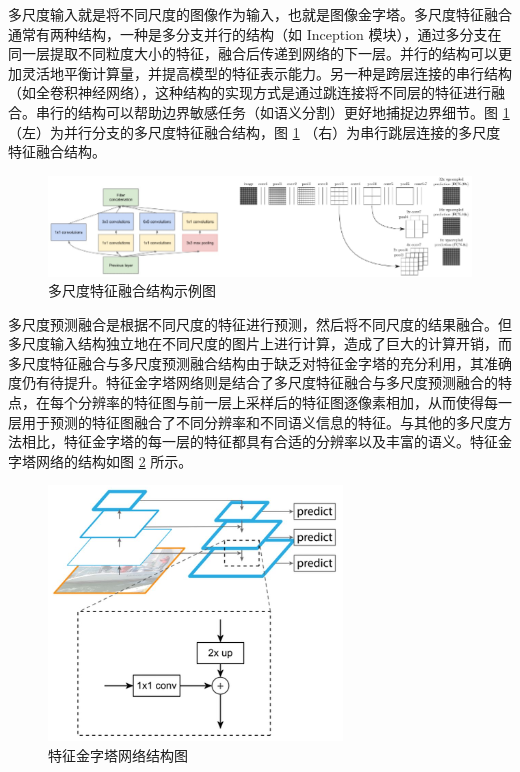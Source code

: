 多尺度输入就是将不同尺度的图像作为输入，也就是图像金字塔。多尺度特征融合通常有两种结构，一种是多分支并行的结构（如 Inception 模块），通过多分支在同一层提取不同粒度大小的特征，融合后传递到网络的下一层。并行的结构可以更加灵活地平衡计算量，并提高模型的特征表示能力。另一种是跨层连接的串行结构（如全卷积神经网络），这种结构的实现方式是通过跳连接将不同层的特征进行融合。串行的结构可以帮助边界敏感任务（如语义分割）更好地捕捉边界细节。图 \ref{fig:fig2-13} （左）为并行分支的多尺度特征融合结构，图 \ref{fig:fig2-13} （右）为串行跳层连接的多尺度特征融合结构。

\begin{figure}[!htbp]
	\centering
	\includegraphics{figures/14.png}
	\caption{多尺度特征融合结构示例图}
	\label{fig:fig2-13}
	\vspace{-0.8cm}  %
\end{figure}

多尺度预测融合是根据不同尺度的特征进行预测，然后将不同尺度的结果融合。但多尺度输入结构独立地在不同尺度的图片上进行计算，造成了巨大的计算开销，而多尺度特征融合与多尺度预测融合结构由于缺乏对特征金字塔的充分利用，其准确度仍有待提升。特征金字塔网络则是结合了多尺度特征融合与多尺度预测融合的特点，在每个分辨率的特征图与前一层上采样后的特征图逐像素相加，从而使得每一层用于预测的特征图融合了不同分辨率和不同语义信息的特征。与其他的多尺度方法相比，特征金字塔的每一层的特征都具有合适的分辨率以及丰富的语义。特征金字塔网络的结构如图 \ref{fig:fig2-14} 所示。

\begin{figure}[!htbp]
	\centering
	\includegraphics{figures/15.png}
	\caption{特征金字塔网络结构图}
	\label{fig:fig2-14}
	\vspace{-0.8cm}  %
\end{figure}

